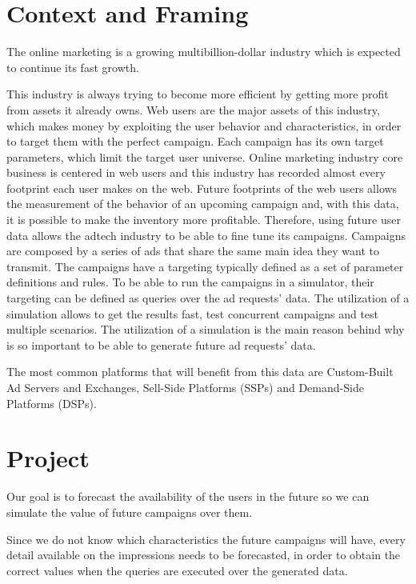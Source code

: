 \documentclass[9pt,a4paper]{extarticle}
\begin{document}
\begin{multicols}{2}

\section{Context and Framing} \label{sec:context}

The online marketing is a growing multibillion-dollar industry \cite{PricewaterhouseCoopers2013}
which is expected to continue its fast growth\cite{PricewaterhouseCoopers2013a}.

This industry is always trying to become more efficient by getting more profit from
assets it already owns. 
Web users are the major assets of this industry, which makes money by exploiting the user behavior and characteristics, in order to target them with the
perfect campaign. Each campaign has its own target parameters, which limit the target user universe.
Online marketing industry core business is centered in web users and this industry has recorded almost every footprint each user makes on the web.
Future footprints of the web users allows the measurement of the behavior of an
upcoming campaign and, with this data, it is possible to make the inventory more
profitable. Therefore, using future user data allows the adtech industry to be able to fine tune its campaigns. 
Campaigns are composed by a series of ads that share the same main idea they
want to transmit. The campaigns have a targeting typically defined as a set of
parameter definitions and rules. To be able to run the campaigns in a
simulator, their targeting can be defined as
queries over the ad requests' data. The utilization of a simulation allows to
get the results fast, test concurrent campaigns and test multiple scenarios.
The utilization of a simulation is the main reason behind
why is so important to be able to generate future ad requests' data.

The most common platforms that will benefit from this data are Custom-Built Ad
Servers and Exchanges, Sell-Side Platforms (SSPs) and
Demand-Side Platforms
(DSPs).

\section{Project} \label{sec:proj}

Our goal is to forecast the availability of the users in the future so we can
simulate the value of future campaigns over them.

Since we do not know which characteristics the future campaigns will have, every
detail available on the impressions needs to be forecasted, in order to
obtain the correct values when the queries are executed over the generated data.


\end{multicols}
\end{document}
